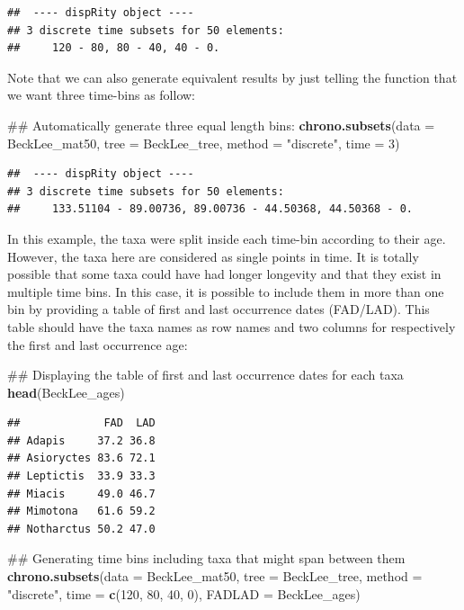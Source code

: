 \documentclass[]{book}
\newenvironment{Shaded}{\begin{snugshade}}{\end{snugshade}}
\newcommand{\KeywordTok}[1]{\textcolor[rgb]{0.13,0.29,0.53}{\textbf{#1}}}
\newcommand{\DataTypeTok}[1]{\textcolor[rgb]{0.13,0.29,0.53}{#1}}
\newcommand{\DecValTok}[1]{\textcolor[rgb]{0.00,0.00,0.81}{#1}}
\newcommand{\StringTok}[1]{\textcolor[rgb]{0.31,0.60,0.02}{#1}}
\newcommand{\NormalTok}[1]{#1}
\theoremstyle{definition}
\theoremstyle{definition}
\theoremstyle{remark}
\begin{document}
\begin{verbatim}
##  ---- dispRity object ---- 
## 3 discrete time subsets for 50 elements:
##     120 - 80, 80 - 40, 40 - 0.
\end{verbatim}

Note that we can also generate equivalent results by just telling the
function that we want three time-bins as follow:

\begin{Shaded}
\begin{Highlighting}[]
\NormalTok{## Automatically generate three equal length bins:}
\KeywordTok{chrono.subsets}\NormalTok{(}\DataTypeTok{data =}\NormalTok{ BeckLee_mat50, }\DataTypeTok{tree =}\NormalTok{ BeckLee_tree, }\DataTypeTok{method =} \StringTok{"discrete"}\NormalTok{,}
                \DataTypeTok{time =} \DecValTok{3}\NormalTok{)}
\end{Highlighting}
\end{Shaded}

\begin{verbatim}
##  ---- dispRity object ---- 
## 3 discrete time subsets for 50 elements:
##     133.51104 - 89.00736, 89.00736 - 44.50368, 44.50368 - 0.
\end{verbatim}

In this example, the taxa were split inside each time-bin according to
their age. However, the taxa here are considered as single points in
time. It is totally possible that some taxa could have had longer
longevity and that they exist in multiple time bins. In this case, it is
possible to include them in more than one bin by providing a table of
first and last occurrence dates (FAD/LAD). This table should have the
taxa names as row names and two columns for respectively the first and
last occurrence age:

\begin{Shaded}
\begin{Highlighting}[]
\NormalTok{## Displaying the table of first and last occurrence dates for each taxa}
\KeywordTok{head}\NormalTok{(BeckLee_ages)}
\end{Highlighting}
\end{Shaded}

\begin{verbatim}
##             FAD  LAD
## Adapis     37.2 36.8
## Asioryctes 83.6 72.1
## Leptictis  33.9 33.3
## Miacis     49.0 46.7
## Mimotona   61.6 59.2
## Notharctus 50.2 47.0
\end{verbatim}

\begin{Shaded}
\begin{Highlighting}[]
\NormalTok{## Generating time bins including taxa that might span between them}
\KeywordTok{chrono.subsets}\NormalTok{(}\DataTypeTok{data =}\NormalTok{ BeckLee_mat50, }\DataTypeTok{tree =}\NormalTok{ BeckLee_tree, }\DataTypeTok{method =} \StringTok{"discrete"}\NormalTok{,}
                \DataTypeTok{time =} \KeywordTok{c}\NormalTok{(}\DecValTok{120}\NormalTok{, }\DecValTok{80}\NormalTok{, }\DecValTok{40}\NormalTok{, }\DecValTok{0}\NormalTok{), }\DataTypeTok{FADLAD =}\NormalTok{ BeckLee_ages)}
\end{Highlighting}
\end{Shaded}
\end{document}
